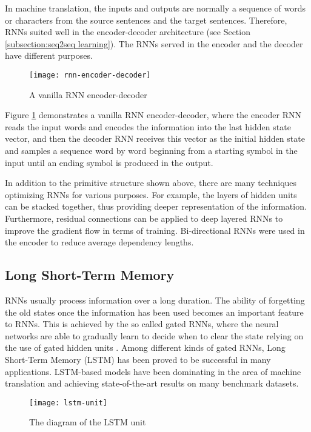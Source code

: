 In machine translation, the inputs and outputs are normally a sequence of words or characters from the source sentences and the target sentences. Therefore, RNNs suited well in the encoder-decoder architecture (see Section \ref{subsection:seq2seq learning}). The RNNs served in the encoder and the decoder have different purposes. 
\begin{figure}[h]
\texttt{[image: rnn-encoder-decoder]}
\centering
\caption{A vanilla RNN encoder-decoder}
\label{figure:vanilla rnn encoder-decoder}
\end{figure}
Figure \ref{figure:vanilla rnn encoder-decoder} demonstrates a vanilla RNN encoder-decoder, where the encoder RNN reads the input words and encodes the information into the last hidden state vector, and then the decoder RNN receives this vector as the initial hidden state and samples a sequence word by word beginning from a starting symbol in the input until an ending symbol is produced in the output.

In addition to the primitive structure shown above, there are many techniques optimizing RNNs for various purposes. For example, the layers of hidden units can be stacked together, thus providing deeper representation of the information. Furthermore, residual connections \cite{Wu2016} can be applied to deep layered RNNs to improve the gradient flow in terms of training. Bi-directional RNNs \cite{schuster1997bidirectional} were used in the encoder to reduce average dependency lengths.

\subsection{Long Short-Term Memory} \label{subsection:lstm}
RNNs usually process information over a long duration. The ability of forgetting the old states once the information has been used becomes an important feature to RNNs. This is achieved by the so called gated RNNs, where the neural networks are able to gradually learn to decide when to clear the state relying on the use of gated hidden units \cite{Goodfellow-et-al-2016}. Among different kinds of gated RNNs, Long Short-Term Memory (LSTM) \cite{hochreiter1997long} has been proved to be successful in many applications. LSTM-based models \cite{Wu2016,Sutskever2014} have been dominating in the area of machine translation and achieving state-of-the-art results on many benchmark datasets.

\begin{figure}[h]
\texttt{[image: lstm-unit]}
\centering
\caption{The diagram of the LSTM unit}
\label{figure:lstm unit}
\end{figure}

